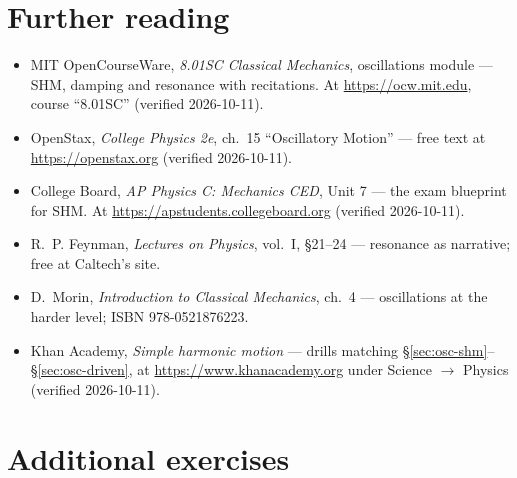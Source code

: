 \section*{Further reading}

\begin{itemize}
\item MIT OpenCourseWare, \emph{8.01SC Classical Mechanics}, oscillations
module --- SHM, damping and resonance with recitations. At
\url{https://ocw.mit.edu}, course ``8.01SC'' (verified 2026-10-11).
\item OpenStax, \emph{College Physics 2e}, ch.~15 ``Oscillatory Motion''
--- free text at \url{https://openstax.org} (verified 2026-10-11).
\item College Board, \emph{AP Physics C: Mechanics CED}, Unit 7 --- the
exam blueprint for SHM. At \url{https://apstudents.collegeboard.org}
(verified 2026-10-11).
\item R.~P. Feynman, \emph{Lectures on Physics}, vol.~I, \S21--24 ---
resonance as narrative; free at Caltech's site.
\item D.~Morin, \emph{Introduction to Classical Mechanics}, ch.~4 ---
oscillations at the harder level; ISBN 978-0521876223.
\item Khan Academy, \emph{Simple harmonic motion} --- drills matching
\S\ref{sec:osc-shm}--\S\ref{sec:osc-driven}, at
\url{https://www.khanacademy.org} under Science $\to$ Physics (verified
2026-10-11).
\end{itemize}

\section*{Additional exercises}

